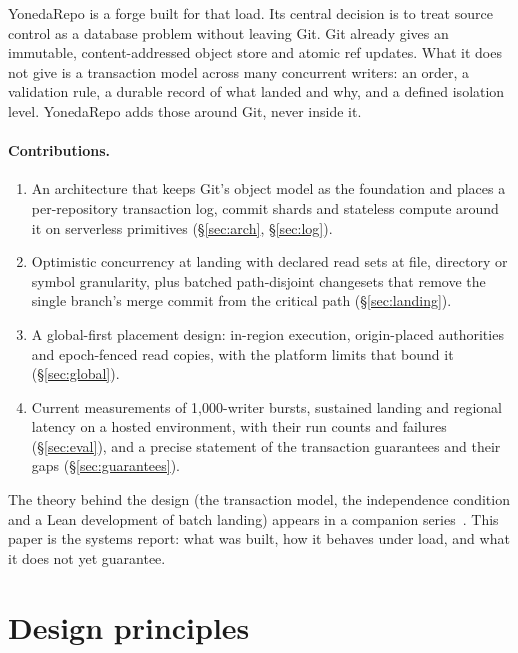 \documentclass[11pt]{article}
\begin{document}
YonedaRepo is a forge built for that load. Its central decision is to treat source
control as a database problem without leaving Git. Git already gives an immutable,
content-addressed object store and atomic ref updates. What it does not give is a
transaction model across many concurrent writers: an order, a validation rule, a
durable record of what landed and why, and a defined isolation level. YonedaRepo adds
those around Git, never inside it.

\paragraph{Contributions.}
\begin{enumerate}
\item An architecture that keeps Git's object model as the foundation and places a
  per-repository transaction log, commit shards and stateless compute around it on
  serverless primitives (\S\ref{sec:arch}, \S\ref{sec:log}).
\item Optimistic concurrency at landing with declared read sets at file, directory or
  symbol granularity, plus batched path-disjoint changesets that remove the single
  branch's merge commit from the critical path (\S\ref{sec:landing}).
\item A global-first placement design: in-region execution, origin-placed authorities
  and epoch-fenced read copies, with the platform limits that bound it
  (\S\ref{sec:global}).
\item Current measurements of 1,000-writer bursts, sustained landing and regional
  latency on a hosted environment, with their run counts and failures
  (\S\ref{sec:eval}), and a precise statement of the transaction guarantees and their
  gaps (\S\ref{sec:guarantees}).
\end{enumerate}

The theory behind the design (the transaction model, the independence condition and a
Lean development of batch landing) appears in a companion series~\cite{long2026series}.
This paper is the systems report: what was built, how it behaves under load, and what
it does not yet guarantee.

\section{Design principles}
\label{sec:principles}
\end{document}
